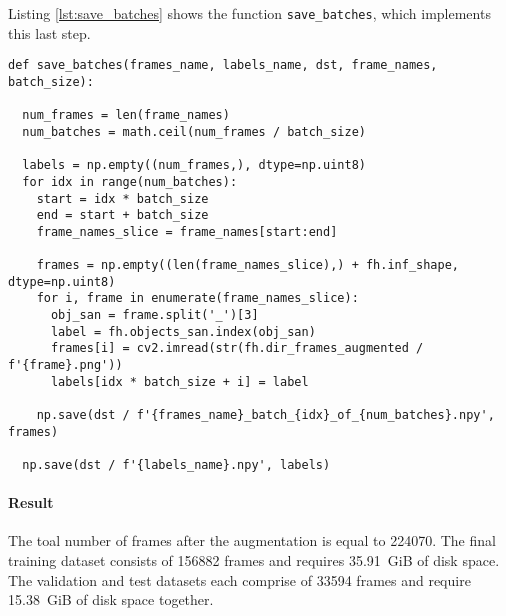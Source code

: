 Listing \ref{lst:save_batches} shows the function \texttt{save\_batches}, which implements this last step.

\begin{lstlisting}[style=python, caption={Python function \texttt{save\_batches} to save the batch arrays and the label array}, label=lst:save_batches]
def save_batches(frames_name, labels_name, dst, frame_names, batch_size):

  num_frames = len(frame_names)
  num_batches = math.ceil(num_frames / batch_size)

  labels = np.empty((num_frames,), dtype=np.uint8)
  for idx in range(num_batches):
    start = idx * batch_size
    end = start + batch_size
    frame_names_slice = frame_names[start:end]

    frames = np.empty((len(frame_names_slice),) + fh.inf_shape, dtype=np.uint8)
    for i, frame in enumerate(frame_names_slice):
      obj_san = frame.split('_')[3]
      label = fh.objects_san.index(obj_san)
      frames[i] = cv2.imread(str(fh.dir_frames_augmented / f'{frame}.png'))
      labels[idx * batch_size + i] = label

    np.save(dst / f'{frames_name}_batch_{idx}_of_{num_batches}.npy', frames)

  np.save(dst / f'{labels_name}.npy', labels)
\end{lstlisting}

\paragraph{Result}
The toal number of frames after the augmentation is equal to \num{224070}.
The final training dataset consists of \num{156882} frames and requires \SI{35.91}{GiB} of disk space.
The validation and test datasets each comprise of \num{33594} frames and require \SI{15.38}{GiB} of disk space together.
